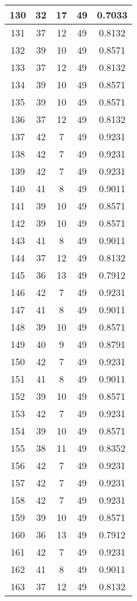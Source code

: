 \documentclass[letterpaper, 12pt]{article}
\begin{document}
\begin{longtable}{|c|c|c|c|c|}
\hline
130 & 32 & 17 & 49 & 0.7033 \\
\hline
131 & 37 & 12 & 49 & 0.8132 \\
\hline
132 & 39 & 10 & 49 & 0.8571 \\
\hline
133 & 37 & 12 & 49 & 0.8132 \\
\hline
134 & 39 & 10 & 49 & 0.8571 \\
\hline
135 & 39 & 10 & 49 & 0.8571 \\
\hline
136 & 37 & 12 & 49 & 0.8132 \\
\hline
137 & 42 & 7 & 49 & 0.9231 \\
\hline
138 & 42 & 7 & 49 & 0.9231 \\
\hline
139 & 42 & 7 & 49 & 0.9231 \\
\hline
140 & 41 & 8 & 49 & 0.9011 \\
\hline
141 & 39 & 10 & 49 & 0.8571 \\
\hline
142 & 39 & 10 & 49 & 0.8571 \\
\hline
143 & 41 & 8 & 49 & 0.9011 \\
\hline
144 & 37 & 12 & 49 & 0.8132 \\
\hline
145 & 36 & 13 & 49 & 0.7912 \\
\hline
146 & 42 & 7 & 49 & 0.9231 \\
\hline
147 & 41 & 8 & 49 & 0.9011 \\
\hline
148 & 39 & 10 & 49 & 0.8571 \\
\hline
149 & 40 & 9 & 49 & 0.8791 \\
\hline
150 & 42 & 7 & 49 & 0.9231 \\
\hline
151 & 41 & 8 & 49 & 0.9011 \\
\hline
152 & 39 & 10 & 49 & 0.8571 \\
\hline
153 & 42 & 7 & 49 & 0.9231 \\
\hline
154 & 39 & 10 & 49 & 0.8571 \\
\hline
155 & 38 & 11 & 49 & 0.8352 \\
\hline
156 & 42 & 7 & 49 & 0.9231 \\
\hline
157 & 42 & 7 & 49 & 0.9231 \\
\hline
158 & 42 & 7 & 49 & 0.9231 \\
\hline
159 & 39 & 10 & 49 & 0.8571 \\
\hline
160 & 36 & 13 & 49 & 0.7912 \\
\hline
161 & 42 & 7 & 49 & 0.9231 \\
\hline
162 & 41 & 8 & 49 & 0.9011 \\
\hline
163 & 37 & 12 & 49 & 0.8132 \\

\end{longtable}
\end{document}

